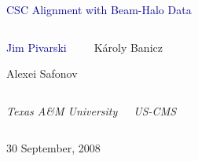\documentclass[compress]{beamer}
\begin{document}
\begin{frame}
\vfill
\begin{center}
\textcolor{darkblue}{\Large CSC Alignment with Beam-Halo Data}

\vfill
\begin{columns}
\begin{center}
\large
\textcolor{darkblue}{Jim Pivarski}

\vspace{0.2 cm}
Alexei Safonov
\end{center}

\begin{center}
\large
K\'aroly Banicz
\end{center}
\end{columns}

\begin{columns}
\begin{center}
\scriptsize
{\it Texas A\&M University}
\end{center}
\begin{center}
\scriptsize
{\it US-CMS}
\end{center}
\end{columns}

\vfill
30 September, 2008

\end{center}
\end{frame}

\end{document}
